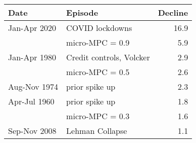 \begin{tabular}{llr}
\toprule
        Date &                  Episode &  Decline \\
\midrule
Jan-Apr 2020 &          COVID lockdowns &     16.9 \\
             &          micro-MPC = 0.9 &      5.9 \\
Jan-Apr 1980 & Credit controls, Volcker &      2.9 \\
             &          micro-MPC = 0.5 &      2.6 \\
Aug-Nov 1974 &           prior spike up &      2.3 \\
Apr-Jul 1960 &           prior spike up &      1.8 \\
             &          micro-MPC = 0.3 &      1.6 \\
Sep-Nov 2008 &          Lehman Collapse &      1.1 \\
\bottomrule
\end{tabular}
